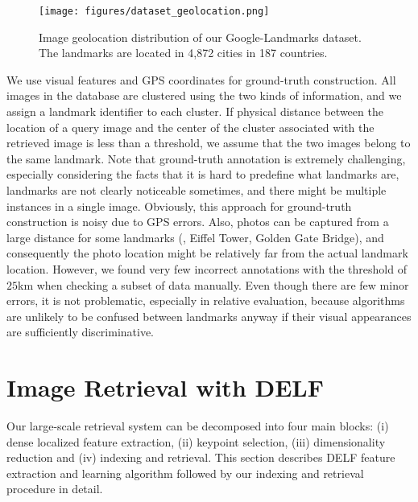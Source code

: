 \documentclass[10pt,twocolumn,letterpaper]{article}
\begin{document}
\begin{figure}[t]
\begin{center}
   \texttt{[image: figures/dataset\_geolocation.png]}
\end{center}
	\vspace{-15pt}
	\caption{Image geolocation distribution of our Google-Landmarks dataset.  The landmarks are located in 4,872 cities in 187 countries.}
\label{fig:geolocation}
\vspace{-6pt}                                                                                                                                                                                                           
\end{figure}



We use visual features and GPS coordinates for ground-truth construction.
All images in the database are clustered using the two kinds of information, and we assign a landmark identifier to each cluster.
If physical distance between the location of a query image and the center of the cluster associated with the retrieved image is less than a threshold, we assume that the two images belong to the same landmark.
Note that ground-truth annotation is extremely challenging, especially considering the facts that it is hard to predefine what landmarks are, landmarks are not clearly noticeable sometimes, and there might be multiple instances in a single image.
Obviously, this approach for ground-truth construction is noisy due to GPS errors.
Also, photos can be captured from a large distance for some landmarks (\eg, Eiffel Tower, Golden Gate Bridge), and consequently the photo location might be relatively far from the actual landmark location.
However, we found very few incorrect annotations with the threshold of $25$km when checking a subset of data manually.
Even though there are few minor errors, it is not problematic, especially in relative evaluation, because algorithms are unlikely to be confused between landmarks anyway if their visual appearances are sufficiently discriminative.




 

\section{Image Retrieval with DELF} \label{sec:method}

Our large-scale retrieval system can be decomposed into four main blocks: (i) dense localized
feature extraction, (ii) keypoint selection, (iii) dimensionality reduction and 
(iv) indexing and retrieval.
This section describes DELF feature extraction and learning algorithm followed by our indexing and retrieval procedure in detail.
\end{document}
